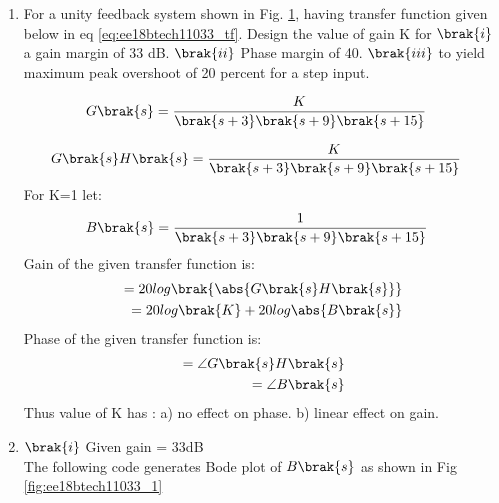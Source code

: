 \begin{enumerate}[label=\thesubsection.\arabic*.,ref=\thesubsection.\theenumi]

\item
For a unity feedback system shown in  Fig.    \ref{fig:flow}, having transfer function given below in  eq \ref{eq:ee18btech11033_tf}.  Design the value of gain K for $\brak{i}$ a gain margin of 33 dB. $\brak{ii}$ Phase margin of 40\degree. $\brak{iii}$ to yield maximum peak overshoot of 20 percent for a step input.

\begin{figure}[!ht]
	\begin{center}
		
		\resizebox{\columnwidth}{!}{}
	\end{center}
\caption{}
\label{fig:flow}
\end{figure}

\begin{align}
\label{eq:ee18btech11033_tf}
G\brak{s} &= \frac{K}{\brak{s+3}\brak{s+9}\brak{s+15}}
\end{align}
\solution 

\begin{align}
\label{eq:ee18btech11033_Tf(s)}
G\brak{s}H\brak{s} &=\frac{K}{\brak{s+3}\brak{s+9}\brak{s+15}}
\end{align}
For K=1 let:
\begin{align}
\label{eq:ee18btech11033_B(s)}
B\brak{s} &= \frac{1}{\brak{s+3}\brak{s+9}\brak{s+15}}
\end{align}
Gain of the given transfer function is:
\begin{align}
\label{eq:ee18btech11033_gain}
      = 20log\brak{\abs{G\brak{s}H\brak{s}}}
    \\= 20log\brak{K} +20log\abs{B\brak{s}}
\end{align}
Phase of the given transfer function is:
\begin{align}
\label{eq:ee18btech11033_phase}
      = \angle{G\brak{s}H\brak{s}}
    \\= \angle{B\brak{s}}
\end{align}
 Thus value of K has : a) no effect on phase. b) linear effect on gain.




\item $\brak{i}$ Given gain = 33dB
\\
\solution The following code generates Bode plot of $B\brak{s}$ as shown in Fig \ref{fig:ee18btech11033_1}


\end{enumerate}
